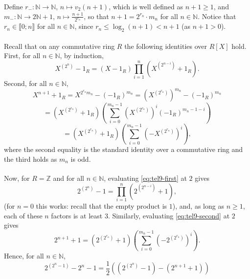 \begin{solution}
    Define \( r_{-} \colon \mathbb{N} \to \mathbb{N} \), \( n \mapsto v_2\left(n+1\right) \), which is well defined as \( n+1 \geq 1 \), and \( m_{-} \colon \mathbb{N} \to 2\mathbb{N}+1 \), \( n \mapsto \frac{n+1}{2^{r_n}} \), so that \( n+1 = 2^{r_n} \cdot m_n \) for all \( n \in \mathbb{N} \). Notice that \( r_n \in \llbracket 0;n \rrbracket \) for all \( n \in \mathbb{N} \), since \( r_n \leq \log_2\left(n+1\right) < n+1 \) (as \( n+1 > 0 \)).
    \\\\
    Recall that on any commutative ring \( R \) the following identities over \( R\left[X\right] \) hold. First, for all \( n \in \mathbb{N} \), by induction,
    \begin{equation}
        X^{\left(2^n\right)}-1_R = \left(X-1_R\right)\prod_{i=1}^{n} \left(X^{\left(2^{n-i}\right)}+1_R\right). \label{eq:tel9-first}
    \end{equation}
    Second, for all \( n \in \mathbb{N} \),
    \[
        X^{n+1}+1_R = X^{2^{r_n} m_n}-\left(-1_R\right)^{m_n} = \left(X^{\left(2^{r_n}\right)}\right)^{m_n}-\left(-1_R\right)^{m_n}
    \]
    \[
        = \left(X^{\left(2^{r_n}\right)}+1_R\right)\left(\sum_{i=0}^{m_n-1} \left(X^{\left(2^{r_n}\right)}\right)^i \left(-1_R\right)^{m_n-1-i}\right)
    \]
    \begin{equation}
        = \left(X^{\left(2^{r_n}\right)}+1_R\right)\left(\sum_{i=0}^{m_n-1} \left(-X^{\left(2^{r_n}\right)}\right)^i\right), \label{eq:tel9-second}
    \end{equation}
    where the second equality is the standard identity over a commutative ring and the third holds as \( m_n \) is odd.
    \\\\
    Now, for \( R = \mathbb{Z} \) and for all \( n \in \mathbb{N} \), evaluating \eqref{eq:tel9-first} at \( 2 \) gives
    \[
        2^{\left(2^n\right)}-1 = \prod_{i=1}^{n} \left(2^{\left(2^{n-i}\right)}+1\right),
    \]
    (for \( n = 0 \) this works: recall that the empty product is \( 1 \)), and, as long as \( n \geq 1 \), each of these \( n \) factors is at least \( 3 \). Similarly, evaluating \eqref{eq:tel9-second} at \( 2 \) gives
    \[
        2^{n+1}+1 = \left(2^{\left(2^{r_n}\right)}+1\right)\left(\sum_{i=0}^{m_n-1} \left(-2^{\left(2^{r_n}\right)}\right)^i\right).
    \]
    Hence, for all \( n \in \mathbb{N} \),
    \[
        2^{\left(2^n-1\right)}-2^n-1 = \frac{1}{2}\left(\left(2^{\left(2^n\right)}-1\right)-\left(2^{n+1}+1\right)\right)
\]
\end{solution}
